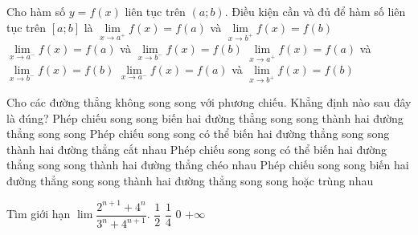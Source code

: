 \begin{ex}%
	Cho hàm số $y=f\left(x\right)$ liên tục trên $(a;b)$. Điều kiện cần và đủ để hàm số liên tục trên $\left[a; b\right]$ là
	\choice
	{${\mathop{\lim}\limits_{x\to a^{+}}} f\left(x\right)=f\left(a\right)$ và ${\mathop{\lim}\limits_{x\to b^{+}}} f\left(x\right)=f\left(b\right)$}
	{${\mathop{\lim}\limits_{x\to a^{-}}} f\left(x\right)=f\left(a\right)$ và ${\mathop{\lim}\limits_{x\to b^{-}}} f\left(x\right)=f\left(b\right)$}
	{\True ${\mathop{\lim}\limits_{x\to a^{+}}} f\left(x\right)=f\left(a\right)$ và ${\mathop{\lim}\limits_{x\to b^{-}}} f\left(x\right)=f\left(b\right)$}
	{${\mathop{\lim}\limits_{x\to a^{-}}} f\left(x\right)=f\left(a\right)$ và ${\mathop{\lim}\limits_{x\to b^{+}}} f\left(x\right)=f\left(b\right)$}
\end{ex}

\begin{ex}%
	Cho các đường thẳng không song song với phương chiếu. Khẳng định nào sau đây là đúng?
	\choice
	{Phép chiếu song song biến hai đường thẳng song song thành hai đường thẳng song song}
	{Phép chiếu song song có thể biến hai đường thẳng song song thành hai đường thẳng cắt nhau}
	{Phép chiếu song song có thể biến hai đường thẳng song song thành hai đường thẳng chéo nhau}
	{\True Phép chiếu song song biến hai đường thẳng song song thành hai đường thẳng song song hoặc trùng nhau}
\end{ex}

\begin{ex}%
	Tìm giới hạn $\lim \dfrac{2^{n+1}+4^n}{3^n+4^{n+1}}$.
	\choice
	{$\dfrac{1}{2}$}
	{\True $\dfrac{1}{4}$}
	{$0$}
	{$+\infty$}
\end{ex}

